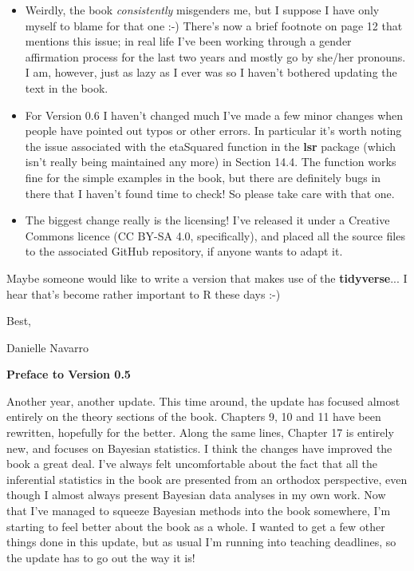 \begin{itemize}
\item Weirdly, the book {\it consistently} misgenders me, but I suppose I have only myself to blame for that one :-) There's now a brief footnote on page 12 that mentions this issue; in real life I've been working through a gender affirmation process for the last two years and mostly go by she/her pronouns. I am, however, just as lazy as I ever was so I haven't bothered updating the text in the book.  
\item For Version 0.6 I haven't changed much I've made a few minor changes when people have pointed out typos or other errors. In particular it's worth noting the issue associated with the etaSquared function in the {\bf lsr} package (which isn't really being maintained any more) in Section 14.4. The function works fine for the simple examples in the book, but there are definitely bugs in there that I haven't found time to check! So please take care with that one. 
\item The biggest change really is the licensing! I've released it under a Creative Commons licence (CC BY-SA 4.0, specifically), and placed all the source files to the associated GitHub repository, if anyone wants to adapt it.
\end{itemize} 

\noindent
Maybe someone would like to write a version that makes use of the {\bf tidyverse}... I hear that's become rather important to R these days :-)

\vspace*{24pt}
\noindent
Best,

\noindent
Danielle Navarro

 
\vspace*{30pt}

\begin{center}{\Large {\bf Preface to Version 0.5}}\end{center}
\vspace*{12pt}

\noindent
Another year, another update. This time around, the update has focused almost entirely on the theory sections of the book. Chapters 9, 10 and 11 have been rewritten, hopefully for the better. Along the same lines, Chapter 17 is entirely new, and focuses on Bayesian statistics. I think the changes have improved the book a great deal. I've always felt uncomfortable about the fact that all the inferential statistics in the book are presented from an orthodox perspective, even though I almost always present Bayesian data analyses in my own work. Now that I've managed to squeeze Bayesian methods into the book somewhere, I'm starting to feel better about the book as a whole. I wanted to get a few other things done in this update, but as usual I'm running into teaching deadlines, so the update has to go out the way it is!

